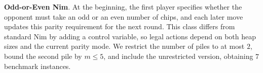 \documentclass[review]{elsarticle}
\newcommand{\set}[1]{\{ #1 \}}
\newcommand{\tuple}[1]{\langle {#1} \rangle}
\newcommand{\true}{\top}
\newcommand{\statevar}{\mathcal{X}}
\newcommand{\act}{\mathcal{A}}
\newcommand{\constraint}{\mathcal{C}}
\newcommand{\estate}{\mathcal{E}}
\newcommand{\pre}{\mathtt{pre}}
\newcommand{\eff}{\mathtt{eff}}
\newcommand{\modulo}{\equiv}
\begin{document}
\textbf{Odd-or-Even Nim}. At the beginning, the first player specifies whether the opponent must take an odd or an even number of chips, and each later move updates this parity requirement for the next round.
This class differs from standard Nim by adding a control variable, so legal actions depend on both heap sizes and the current parity mode.
We restrict the number of piles to at most $2$, bound the second pile by $m \le 5$, and include the unrestricted version, obtaining $7$ benchmark instances.
\end{document}
